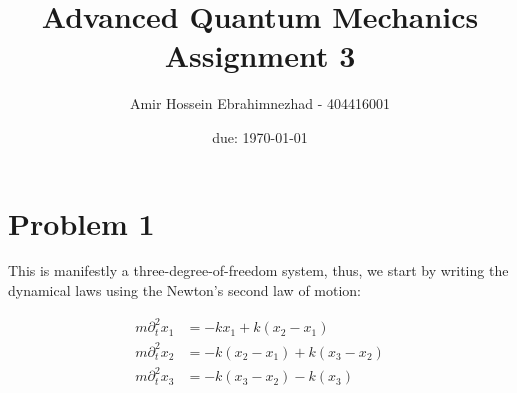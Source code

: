 \documentclass[10pt,twocoloumn]{article}
\title{Advanced Quantum Mechanics Assignment 3}
\author{Amir Hossein Ebrahimnezhad - 404416001}
\date{due: \today}
\begin{document}
\maketitle
\section*{Problem 1}
This is manifestly a three-degree-of-freedom system, thus, we start by writing the dynamical laws using the Newton's second law of motion:

\begin{align}
    m \partial_t^2 x_1 &= -kx_1 + k(x_2 - x_1) \\
    m \partial_t^2 x_2 &= -k(x_2-x_1) + k(x_3-x_2)\\
    m\partial_t^2 x_3 &= -k(x_3 - x_2) - k(x_3)
\end{align}
\end{document}
